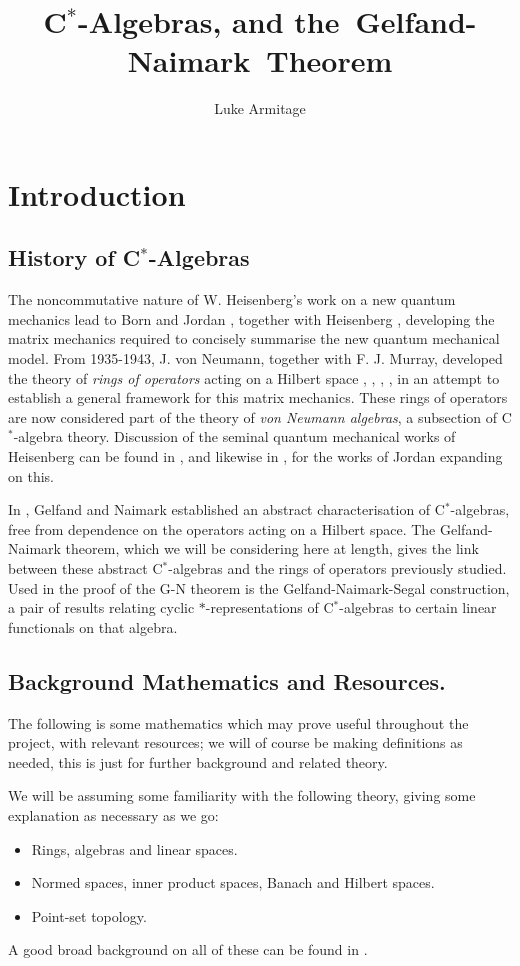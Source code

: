 \documentclass[12pt,a4paper]{amsart}
\author{Luke Armitage}
\title{C$^\ast$-Algebras, and the~Gelfand-Naimark~Theorem}
\theoremstyle{plain}
\theoremstyle{definition}
\begin{document}
\maketitle
\section{Introduction}
\subsection{History of C$^\ast$-Algebras}
	The noncommutative nature of W. Heisenberg's work on a new quantum mechanics \cite{heisenberg25} lead to Born and Jordan \cite{bornjordan25}, together with Heisenberg \cite{bornjordanheisenberg25}, developing the matrix mechanics required to concisely summarise the new quantum mechanical model. 
	From 1935-1943, J. von Neumann, together with F. J. Murray, developed the theory of \emph{rings of operators} acting on a Hilbert space \cite{vonneumann35}, \cite{vonneumann37}, \cite{vonneumann43}, \cite{vonneumann40}, in an attempt to establish a general framework for this matrix mechanics.
	These rings of operators are now considered part of the theory of \emph{von Neumann algebras}, a subsection of C$^\ast$-algebra theory. 
	Discussion of the seminal quantum mechanical works of Heisenberg can be found in \cite{mackinnon77}, and likewise in \cite{schroer03}, for the works of Jordan expanding on this.
	
	In \cite{gelfand43}, Gelfand and Naimark established an abstract characterisation of C$^\ast$-algebras, free from dependence on the operators acting on a Hilbert space.
	The Gelfand-Naimark theorem, which we will be considering here at length, gives the link between these abstract C$^\ast$-algebras and the rings of operators previously studied.
	Used in the proof of the G-N theorem is the Gelfand-Naimark-Segal construction, a pair of results relating cyclic $\ast$-representations of C$^\ast$-algebras to certain linear functionals on that algebra. 
	
	
\subsection{Background Mathematics and Resources.}	
	The following is some mathematics which may prove useful throughout the project, with relevant resources; we will of course be making definitions as needed, this is just for further background and related theory.

	We will be assuming some familiarity with the following theory, giving some explanation as necessary as we go:
\begin{itemize}
	\item Rings, algebras and linear spaces.
	\item Normed spaces, inner product spaces, Banach and Hilbert spaces.
	\item Point-set topology.
\end{itemize}
	A good broad background on all of these can be found in \cite{simmons83}.
\end{document}
